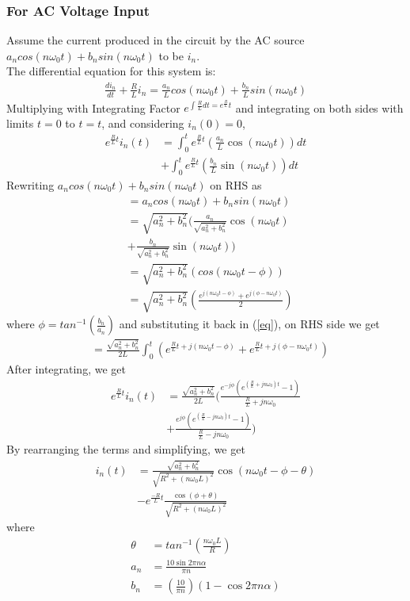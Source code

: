 \begin{multicols}{2}
\subsubsection{For AC Voltage Input}
Assume the current produced in the circuit by the AC source  $a_ncos(n\omega_0t)+b_nsin(n\omega_0t)$ to be $i_n$.\\
The differential equation for this system is:
\begin{align}
    \frac{di_n}{dt}+\frac{R}{L}i_n=\frac{a_n}{L}cos(n\omega_0t)+\frac{b_n}{L}sin(n\omega_0t)
\end{align}
Multiplying with Integrating Factor $e^{\int \frac{R}{L}dt=e^\frac{R}{L}t}$ and integrating on both sides with limits $t=0$ to $t=t$, and considering $i_n(0)=0$,
\begin{align}
e^{\frac{R}{L}t}i_n(t) &= \int_{0}^{t} e^{\frac{R}{L}t} \left( \frac{a_n}{L}\cos(n\omega_0t) \right) dt \nonumber \\
&+ \int_{0}^{t} e^{\frac{R}{L}t} \left( \frac{b_n}{L}\sin(n\omega_0t) \right) dt \label{eq}
\end{align}
Rewriting $a_ncos(n\omega_0t)+b_nsin(n\omega_0t)$ on RHS as 
\begin{align*}
    &=a_ncos(n\omega_0t)+b_nsin(n\omega_0t)\\
    &= \sqrt{a_n^2+b_n^2} \Bigg( \frac{a_n}{\sqrt{a_n^2+b_n^2}} \cos(n\omega_0t) \\
    &+ \frac{b_n}{\sqrt{a_n^2+b_n^2}} \sin(n\omega_0t) \Bigg)\\
    &=\sqrt{a_n^2+b_n^2}\left(cos(n\omega_0t-\phi) \right)\\
    &=\sqrt{a_n^2+b_n^2}\left( \frac{e^{j(n\omega_0t-\phi)}+e^{j(\phi-n\omega_0t)}}{2}\right)
\end{align*}
where $\phi=tan^{-1}\left(\frac{b_n}{a_n} \right)$ and substituting it back in (\ref{eq}), on RHS side we get
\begin{align}
    &=\frac{\sqrt{a_n^2+b_n^2}}{2L}\int_{0}^{t}\left( e^{\frac{R}{L}t+j(n\omega_0t-\phi)} + e^{\frac{R}{L}t+j(\phi-n\omega_0t)} \right)
\end{align}
After integrating, we get
\begin{align}
e^{\frac{R}{L}t}i_n(t) &= \frac{\sqrt{a_n^2+b_n^2}}{2L} \Bigg( \frac{e^{-j\phi}\left(e^{(\frac{R}{L}+jn\omega_0)t}-1 \right)}{\frac{R}{L}+jn\omega_0} \\
&+ \frac{e^{j\phi}\left(e^{(\frac{R}{L}-jn\omega_0)t}-1\right)}{\frac{R}{L}-jn\omega_0} \Bigg)
\end{align}
By rearranging the terms and simplifying, we get
\begin{align}
i_n(t) &= \frac{\sqrt{a_n^2+b_n^2}}{\sqrt{R^2+(n\omega_0L)^2}} \cos(n\omega_0t-\phi-\theta) \\
&- e^{\frac{-R}{L}t} \frac{\cos(\phi+\theta)}{\sqrt{R^2+(n\omega_0L)^2}}
\end{align}
where 
\begin{align*}
    \theta&=tan^{-1}\left(\frac{n\omega_0L}{R}\right)\\
    a_n&=\frac{10 \sin 2 \pi n \alpha}{\pi n} \\
    b_n&=\left( \frac{10}{ \pi n} \right) (1 - \cos 2 \pi n \alpha)
\end{align*}



\end{multicols}
